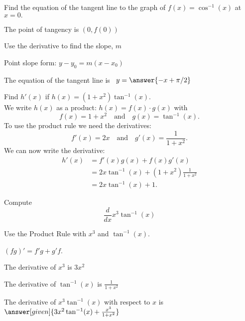 \documentclass{ximera}
\begin{document}
\begin{problem} %

Find the equation of the tangent line to the graph of $f(x) = \cos^{-1}(x)$ at $x=0.$

\begin{hint}
The point of tangency is $(0, f(0))$
\end{hint}
\begin{hint}
Use the derivative to find the slope, $m$
\end{hint}
\begin{hint}
Point slope form: $y-y_0 = m(x-x_0)$
\end{hint}

The equation of the tangent line is \ $y = \answer{-x + \pi/2}$

\end{problem}


\begin{example} %
Find $h'(x)$ if $h(x) = (1+x^2)\tan^{-1}(x)$.\\
We write $h(x)$ as a product: $h(x) = f(x)\cdot g(x)$ with
\[f(x) = 1+x^2 \quad \text{and} \quad g(x) = \tan^{-1}(x).\]
To use the product rule we need the derivatives:
\[f'(x) = 2x \quad \text{and} \quad g'(x) = \frac{1}{1+x^2}.\]
We can now write the derivative:
\begin{align*}
h'(x) &= f'(x)g(x) + f(x)g'(x) \\
&= 2x\tan^{-1}(x)  + (1+x^2)\frac{1}{1+x^2} \\
&=  2x\tan^{-1}(x) + 1.
\end{align*}
\end{example}


\begin{center}
\begin{foldable}
\end{foldable}
\end{center}



\begin{problem} %
  Compute
  \[
  \frac{d}{dx} x^3 \tan^{-1}(x)
  \]
  
    \begin{hint}
      Use the Product Rule with $x^3$ and $\tan^{-1}(x)$.
    \end{hint}
    \begin{hint}
      $(fg)' = f'g+g'f$.
    \end{hint}
    \begin{hint}
      The derivative of $x^3$ is $3x^2$
    \end{hint}
    \begin{hint}
      The derivative of $\tan^{-1}(x)$ is $\frac{1}{1+x^2}$
    \end{hint}
		The derivative of $x^3\tan^{-1}(x)$ with respect to $x$ is
		 $\answer[given]{3x^2 \tan^{-1}(x) + \frac{x^3}{1+x^2}}$
		
\end{problem}
\end{document}

